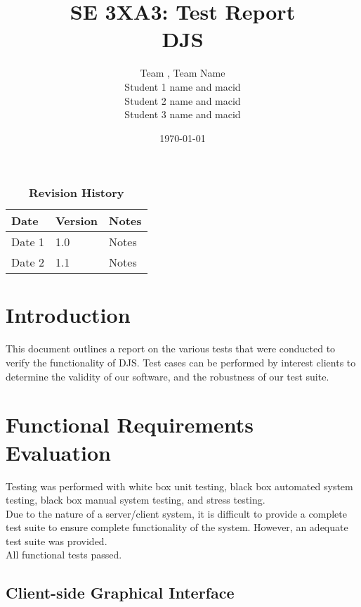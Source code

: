 \documentclass[12pt, titlepage]{article}
\title{SE 3XA3: Test Report\\DJS}
\author{Team , Team Name
		\\ Student 1 name and macid
		\\ Student 2 name and macid
		\\ Student 3 name and macid
}
\date{\today}
\begin{document}
\maketitle

\tableofcontents
\listoftables
\listoffigures

\begin{table}[H]
\caption{\bf Revision History}
\begin{tabularx}{\textwidth}{p{3cm}p{2cm}X}
\toprule {\bf Date} & {\bf Version} & {\bf Notes}\\
\midrule
Date 1 & 1.0 & Notes\\
Date 2 & 1.1 & Notes\\
\bottomrule
\end{tabularx}
\end{table}

\newpage


\section{Introduction}

This document outlines a report on the various tests that were conducted to verify the functionality of DJS. Test cases can be performed by interest clients to determine the validity of our software, and the robustness of our test suite.

\section{Functional Requirements Evaluation}
Testing was performed with white box unit testing, black box automated system testing, black box manual system testing, and stress testing.\\


Due to the nature of a server/client system, it is difficult to provide a complete test suite to ensure complete functionality of the system. However, an adequate test suite was provided. \\


All functional tests passed.


\subsection{Client-side Graphical Interface}
\end{document}
